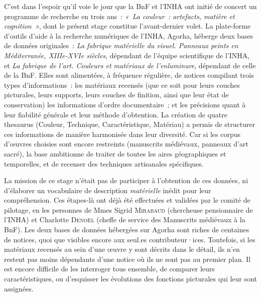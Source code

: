 \documentclass[a4paper,12pt, twoside]{book}
\begin{document}
C’est dans l’espoir qu’il voie le jour que la BnF et l’INHA ont initié de concert un programme de recherche en trois ans~: \textit{«~La couleur~: artefacts, matière et cognition~»}, dont le présent stage constitue l’avant-dernier volet. La plate-forme d’outils d’aide à la recherche numériques de l’INHA, Agorha, héberge deux bases de données originales~: \textit{La fabrique matérielle du visuel. Panneaux peints en Méditerranée, XIIIe-XVIe siècles}, dépendant de l’équipe scientifique de l’INHA, et \textit{La fabrique de l'art. Couleurs et matériaux de l'enluminure}, dépendant de celle de la BnF. Elles sont alimentées, à fréquence régulière, de notices compilant trois types d’informations~: les matériaux recensés (que ce soit pour leurs couches picturales, leurs supports, leurs couches de finition, ainsi que leur état de conservation) les informations d’ordre documentaire~; et les précisions quant à leur fiabilité générale et leur méthode d’obtention. La création de quatre thesaurus (\textsf{Couleur, Technique, Caractéristique, Matériau}) a permis de structurer ces informations de manière harmonisée dans leur diversité. Car si les corpus d’œuvres choisies sont encore restreints (manuscrits médiévaux, panneaux d’art sacré), la base ambitionne de traiter de toutes les aires géographiques et temporelles, et de recenser des techniques artisanales spécifiques.

La mission de ce stage n’était pas de participer à l’obtention de ces données, ni d’élaborer un vocabulaire de description \textit{matérielle} inédit pour leur compréhension. Ces étapes-là ont déjà été effectuées et validées par le comité de pilotage, en les personnes de Mmes Sigrid \textsc{Mirabaud} (chercheuse pensionnaire de l’INHA) et Charlotte \textsc{Denoël} (cheffe de service des Manuscrits médiévaux à la BnF). Les deux bases de données hébergées sur Agorha sont riches de centaines de notices, quoi que visibles encore aux seul.es contributeur·ices. Toutefois, si les matériaux recensés au sein d’une œuvre y sont décrits dans le détail, ils n’en restent pas moins dépendants d’une notice où ils ne sont pas au premier plan. Il est encore difficile de les interroger tous ensemble, de comparer leurs caractéristiques, ou d’esquisser les évolutions des fonctions picturales qui leur sont assignées.
\end{document}
